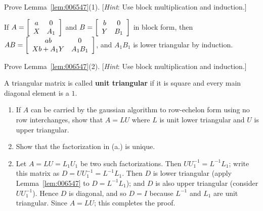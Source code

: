 \begin{multicols}{2}
\begin{ex}\label{ex:ex2_7_7}
Prove Lemma~\ref{lem:006547}(1). [\textit{Hint}: Use block multiplication and induction.]

\begin{sol}
If $A = \left[ \begin{array}{cc}
a & 0 \\
X & A_{1}
\end{array} \right]$
 and $B = \left[ \begin{array}{cc}
 b & 0 \\
 Y & B_{1}
 \end{array} \right]$
 in block form, then $AB = \left[ \begin{array}{cc}
 ab & 0 \\
 Xb + A_{1}Y & A_{1}B_{1}
 \end{array} \right]$,
 and $A_{1}B_{1}$ is lower triangular by induction.
\end{sol}
\end{ex}

\begin{ex}\label{ex:ex2_7_8}
Prove Lemma~\ref{lem:006547}(2). [\textit{Hint}: Use block multiplication and induction.]
\end{ex}

\begin{ex}
A triangular matrix is called \textbf{unit triangular} if it is square and every main diagonal element is a $1$.


\begin{enumerate}[label={\alph*.}]
\item If $A$ can be carried by the gaussian algorithm to row-echelon form using no row interchanges, show that $A = LU$ where $L$ is unit lower triangular and $U$ is upper triangular.

\item Show that the factorization in (a.) is unique.

\end{enumerate}
\begin{sol}
\begin{enumerate}[label={\alph*.}]
\setcounter{enumi}{1}
\item  Let $A = LU = L_{1}U_{1}$ be two such factorizations. Then $UU_{1}^{-1} = L^{-1}L_{1}$; write this matrix as $D = UU_{1}^{-1} = L^{-1}L_{1}$. Then $D$ is lower triangular (apply Lemma~\ref{lem:006547} to $D = L^{-1}L_{1}$); and $D$ is also upper triangular (consider $UU_{1}^{-1}$). Hence $D$ is diagonal, and so $D = I$ because $L^{-1}$ and $L_{1}$ are unit triangular. Since $A = LU$; this completes the proof.


\end{enumerate}
\end{sol}
\end{ex}
\end{multicols}
